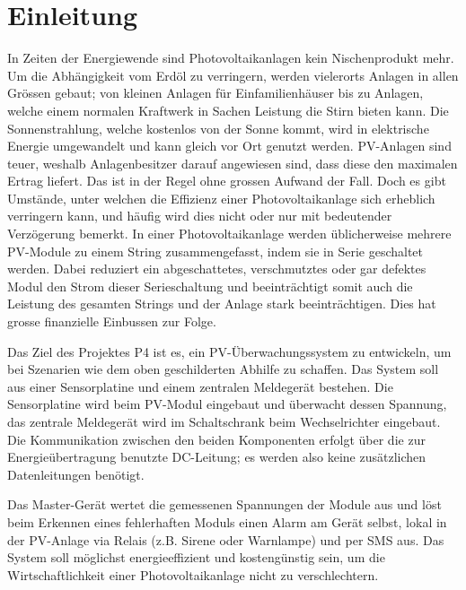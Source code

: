 \chapter{Einleitung}
\label{chap:einleitung}

In Zeiten der Energiewende  sind Photovoltaikanlagen kein Nischenprodukt mehr.
Um die Abh\"angigkeit vom Erd\"ol  zu verringern, werden vielerorts Anlagen in
allen Gr\"ossen gebaut;  von kleinen Anlagen f\"ur  Einfamilienh\"auser bis zu
Anlagen,  welche  einem  normalen  Kraftwerk  in  Sachen  Leistung  die  Stirn
bieten  kann.  Die  Sonnenstrahlung,  welche kostenlos  von  der Sonne  kommt,
wird  in elektrische  Energie  umgewandelt  und kann  gleich  vor Ort  genutzt
werden.   PV-Anlagen sind  teuer,  weshalb  Anlagenbesitzer darauf  angewiesen
sind,  dass diese  den maximalen  Ertrag liefert. Das  ist in  der Regel  ohne
grossen  Aufwand  der  Fall.   Doch  es gibt  Umst\"ande,  unter  welchen  die
Effizienz  einer  Photovoltaikanlage  sich   erheblich  verringern  kann,  und
h\"aufig wird dies  nicht oder nur mit bedeutender  Verz\"ogerung bemerkt.  In
einer  Photovoltaikanlage werden  \"ublicherweise mehrere  PV-Module zu  einem
String zusammengefasst, indem sie  in Serie geschaltet werden. Dabei reduziert
ein abgeschattetes,  verschmutztes oder  gar defektes  Modul den  Strom dieser
Serieschaltung  und  beeintr\"achtigt somit  auch  die  Leistung des  gesamten
Strings und  der Anlage  stark beeintr\"achtigen. Dies hat  grosse finanzielle
Einbussen zur Folge.

Das Ziel des  Projektes P4 ist es, ein  PV-\"Uberwachungssystem zu entwickeln,
um bei  Szenarien wie dem  oben geschilderten Abhilfe zu  schaffen. Das System
soll aus  einer Sensorplatine  und einem zentralen  Meldeger\"at bestehen. Die
Sensorplatine wird  beim PV-Modul  eingebaut und \"uberwacht  dessen Spannung,
das   zentrale  Meldeger\"at   wird  im   Schaltschrank  beim   Wechselrichter
eingebaut. Die Kommunikation  zwischen den  beiden Komponenten  erfolgt \"uber
die  zur  Energie\"ubertragung  benutzte  DC-Leitung;  es  werden  also  keine
zus\"atzlichen Datenleitungen ben\"otigt.

Das Master-Ger\"at wertet die gemessenen  Spannungen der Module aus und l\"ost
beim Erkennen eines  fehlerhaften Moduls einen Alarm am  Ger\"at selbst, lokal
in der PV-Anlage via Relais (z.B. Sirene oder Warnlampe) und per SMS aus.  Das
System  soll m\"oglichst  energieeffizient  und kosteng\"unstig  sein, um  die
Wirtschaftlichkeit einer Photovoltaikanlage nicht zu verschlechtern.

